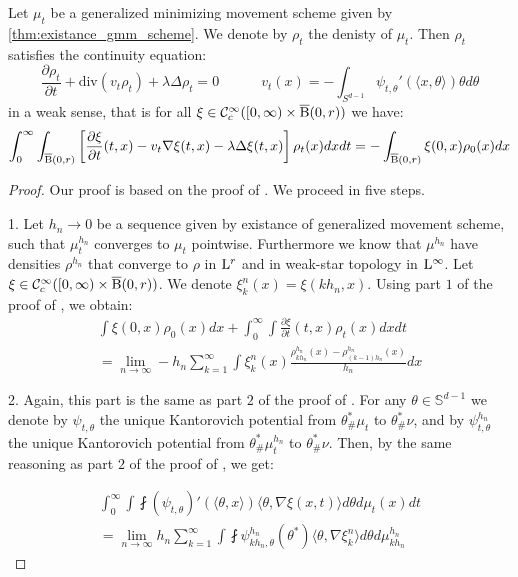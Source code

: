 \begin{thm}
Let $\mu_t$ be a generalized minimizing movement scheme given by \ref{thm:existance_gmm_scheme}. We denote by $\rho_t$ the denisty of $\mu_t$. Then $\rho_t$ satisfies the continuity equation:
\[
\frac{\partial \rho_t}{\partial t} + \text{div}(v_t \rho_t) + \lambda \Delta \rho_t = 0  \quad \quad \quad v_t(x) = - \int_{S^{d-1}} \psi_{t, \theta}'(\langle x , \theta \rangle ) \theta d\theta 
\]
in a weak sense, that is for all $\xi \in \mathcal{C}_c^{\infty} ([0, \infty)\times \operatorname{\overline{B}}(0,r))$ we have:
\[
\int_0^{\infty} \int_{\operatorname{\overline{B}}(0,r)} \left[\frac{\partial \xi}{\partial t}(t,x) - v_t \nabla \xi(t,x)  - \lambda \Delta \xi(t,x)\right] \rho_t(x) dx dt = -\int_{\operatorname{\overline{B}}(0,r)} \xi(0,x)\rho_0(x) dx
\]
\end{thm}
\begin{proof}
Our proof is based on the proof of \cite[Theorem 5.6.1]{bonnotte2013unidimensional}. We proceed in five steps.

1. Let $h_n \rightarrow 0$ be a sequence given by existance of generalized movement scheme, such that $\mu_t^{h_n}$ converges to $\mu_t$ pointwise. Furthermore we know that $\mu^{h_n}$ have densities $\rho^{h_n}$ that converge to $\rho$ in $\mathrm{L}^r$ and in weak-star topology in $\mathrm{L}^{\infty}$. Let $\xi \in \mathcal{C}_c^{\infty} ([0, \infty) \times \operatorname{\overline{B}}(0,r))$. We denote $\xi_{k}^n(x)  = \xi(kh_n, x)$. Using part $1$ of the proof of  \cite[Theorem 5.6.1]{bonnotte2013unidimensional}, we obtain:
\begin{multline} \label{thm:cont_proof_part1}
\int \xi(0, x) \rho_0(x) dx + \int_0^{\infty} \int \frac{\partial \xi}{\partial t}(t,x) \rho_t(x) dx dt \\
= \lim_{n \rightarrow \infty} - h_n \sum_{k=1}^{\infty} \int \xi_k^n(x) \frac{\rho_{kh_n}^{h_n}(x) - \rho_{(k-1)h_n}^{h_n}(x) }{h_n} dx
\end{multline}

2. Again, this part is the same as part $2$ of the proof of  \cite[Theorem 5.6.1]{bonnotte2013unidimensional}. For any $\theta \in \mathbb{S}^{d-1}$ we denote by $\psi_{t, \theta}$ the unique Kantorovich potential from $\theta_{\#}^{*}\mu_t$ to $\theta_{\#}^{*}\nu$, and by $\psi_{t, \theta}^{h_n}$ the unique Kantorovich potential from $\theta_{\#}^{*} \mu_t^{h_n}$ to $\theta_{\#}^{*} \nu$. Then, by the same reasoning as part $2$ of the proof of  \cite[Theorem 5.6.1]{bonnotte2013unidimensional}, we get:

\begin{multline} \label{thm:cont_proof_part2}
\int_0^{\infty} \int \fint (\psi_{t, \theta})' (\langle \theta, x \rangle ) \langle \theta , \nabla \xi (x, t) \rangle d\theta d\mu_t(x) dt \\
= \lim_{n \rightarrow \infty} h_n \sum_{k=1}^{\infty} \int \fint \psi_{kh_n, \theta}^{h_n} (\theta^{*}) \langle \theta, \nabla \xi_{k}^n \rangle d \theta d\mu_{kh_n}^{h_n}
\end{multline}


\end{proof}
